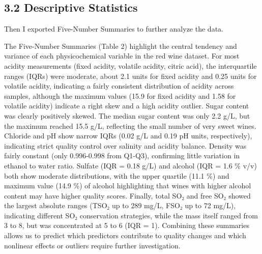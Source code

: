 \documentclass[
  doc,floatsintext]{apa6}
\begin{document}
\subsection{3.2 Descriptive Statistics}\label{descriptive-statistics}

Then I exported Five-Number Summaries to further analyze the data.

The Five-Number Summaries (Table 2) highlight the central tendency and variance of each physicochemical variable in the red wine dataset. For most acidity measurements (fixed acidity, volatile acidity, citric acid), the interquartile ranges (IQRs) were moderate, about 2.1 units for fixed acidity and 0.25 units for volatile acidity, indicating a fairly consistent distribution of acidity across samples, although the maximum values (15.9 for fixed acidity and 1.58 for volatile acidity) indicate a right skew and a high acidity outlier. Sugar content was clearly positively skewed. The median sugar content was only 2.2 g/L, but the maximum reached 15.5 g/L, reflecting the small number of very sweet wines. Chloride and pH show narrow IQRs (0.02 g/L and 0.19 pH units, respectively), indicating strict quality control over salinity and acidity balance. Density was fairly constant (only 0.996-0.998 from Q1-Q3), confirming little variation in ethanol to water ratio. Sulfate (IQR = 0.18 g/L) and alcohol (IQR = 1.6 \% v/v) both show moderate distributions, with the upper quartile (11.1 \%) and maximum value (14.9 \%) of alcohol highlighting that wines with higher alcohol content may have higher quality scores. Finally, total SO₂ and free SO₂ showed the largest absolute ranges (TSO₂ up to 289 mg/L, FSO₂ up to 72 mg/L), indicating different SO₂ conservation strategies, while the mass itself ranged from 3 to 8, but was concentrated at 5 to 6 (IQR = 1). Combining these summaries allows us to predict which predictors contribute to quality changes and which nonlinear effects or outliers require further investigation.
\end{document}

